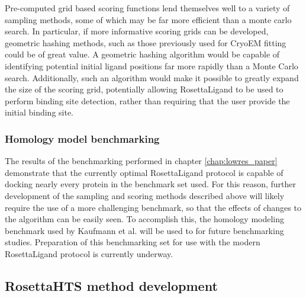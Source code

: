 Pre-computed grid based scoring functions lend themselves well to a variety of sampling methods, some of which may be far more efficient than a monte carlo search.
In particular, if more informative scoring grids can be developed, geometric hashing methods, such as those previously used for CryoEM fitting\citep{Woetzel:2011id} could be of great value.
A geometric hashing algorithm would be capable of identifying potential initial ligand positions far more rapidly than a Monte Carlo search.
Additionally, such an algorithm would make it possible to greatly expand the size of the scoring grid, potentially allowing RosettaLigand to be used to perform binding site detection, rather than requiring that the user provide the initial binding site. 

\subsubsection{Homology model benchmarking}

The results of the benchmarking performed in chapter \ref{chap:lowres_paper} demonstrate that the currently optimal RosettaLigand protocol is capable of docking nearly every protein in the benchmark set used.
For this reason, further development of the sampling and scoring methods described above will likely require the use of a more challenging benchmark, so that the effects of changes to the algorithm can be easily seen. 
To accomplish this, the homology modeling benchmark used by Kaufmann et al.\citep{Kaufmann:2012ck} will be used to for future benchmarking studies.
Preparation of this benchmarking set for use with the modern RosettaLigand protocol is currently underway.

\subsection{RosettaHTS method development}
\label{subsec:hts_further_development}
